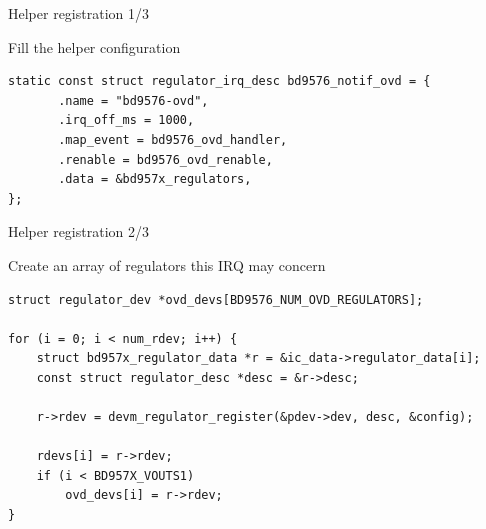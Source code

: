 \documentclass[aspectratio=169]{beamer}
\begin{document}

\begin{frame}[fragile, t]{Helper registration 1/3}\vspace{4pt}

\lstset{language=C}

\large Fill the helper configuration
\vfill

\scriptsize
\begin{lstlisting}
static const struct regulator_irq_desc bd9576_notif_ovd = {              
       .name = "bd9576-ovd",                                            
       .irq_off_ms = 1000,                                              
       .map_event = bd9576_ovd_handler,                                 
       .renable = bd9576_ovd_renable,                                   
       .data = &bd957x_regulators,                                      
}; 
\end{lstlisting}
\end{frame}

\begin{frame}[fragile, t]{Helper registration 2/3}\vspace{4pt}


\lstset{language=C}

\large Create an array of regulators this IRQ may concern
\vfill
{}

\scriptsize

\begin{lstlisting}
struct regulator_dev *ovd_devs[BD9576_NUM_OVD_REGULATORS];

for (i = 0; i < num_rdev; i++) {
	struct bd957x_regulator_data *r = &ic_data->regulator_data[i];
	const struct regulator_desc *desc = &r->desc;

	r->rdev = devm_regulator_register(&pdev->dev, desc, &config);

	rdevs[i] = r->rdev;
	if (i < BD957X_VOUTS1)
		ovd_devs[i] = r->rdev;
}
\end{lstlisting}
\end{frame}
\end{document}
